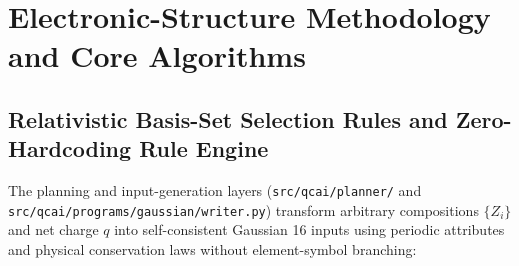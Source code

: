 \documentclass[journal=jctcce,manuscript=article]{achemso}
\begin{document}
\section{Electronic-Structure Methodology and Core Algorithms}

\subsection{Relativistic Basis-Set Selection Rules and Zero-Hardcoding Rule Engine}

The planning and input-generation layers (\texttt{src/qcai/planner/} and \texttt{src/qcai/programs/gaussian/writer.py}) transform arbitrary compositions $\{Z_i\}$ and net charge $q$ into self-consistent Gaussian 16 inputs using periodic attributes and physical conservation laws without element-symbol branching:
\end{document}
